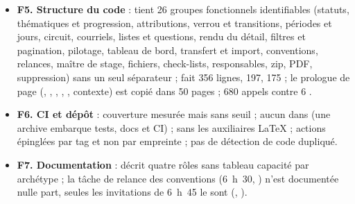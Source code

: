 \documentclass[11pt,a4paper]{article}
\newcommand{\grav}[1]{\textbf{\textcolor{#1}{\textbullet}}}
\newcommand{\mineure}{\grav{gray}}
\begin{document}
\begin{itemize}
    des pages refondues en 0.5.0 (, ,
    , , ...) ; 4
    chaînes avec HTML dont  () qui
    mêle balisage et texte ; dix  (typographie française
    en anglais : , ,
    , , ) ;
    les 17  des événements sont en français alors que Moodle attend de
    l'anglais non traduit ; nom du service web en français () ; langues des
    gabarits et questions limitées à fr/en par le modèle de données (colonne ) ;
    \og DEVE\fg{} 21 fois dans la langue anglaise.
  \item[\mineure] \textbf{F5. Structure du code} :  tient 26 groupes
    fonctionnels identifiables (statuts, thématiques et progression, attributions, verrou et
    transitions, périodes et jours, circuit, courriels, listes et questions, rendu du détail,
    filtres et pagination, pilotage, tableau de bord, transfert et import, conventions, relances,
    maître de stage, fichiers, check-lists, responsables, zip, PDF, suppression) sans un seul
    séparateur ;  fait 356 lignes,
     197,  175 ; le prologue
    de page (, , ,
    , , contexte) est copié dans 50 pages ; 680 appels
     contre 6 .
  \item[\mineure] \textbf{F6. CI et dépôt} : couverture mesurée mais sans seuil ; aucun
     dans  (une archive embarque tests, docs et CI) ;
     sans les auxiliaires LaTeX ; actions épinglées par tag et non par
    empreinte ; pas de détection de code dupliqué.
  \item[\mineure] \textbf{F7. Documentation} :  décrit quatre rôles sans
    tableau capacité par archétype ; la tâche de relance des conventions (6~h~30,
    ) n'est documentée nulle part, seules les invitations de 6~h~45 le sont
    (, ).
\end{itemize}
\end{document}
